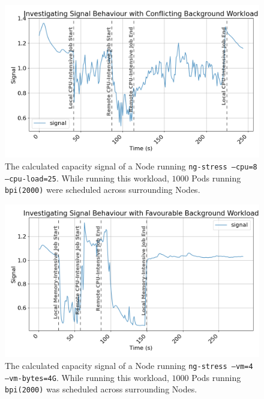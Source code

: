 \begin{figure}[H]
    \centering
    \includegraphics[width=\textwidth]{images/signal-with-cpu.png}
    \caption{The calculated capacity signal of a Node running \texttt{ng-stress
    --cpu=8 --cpu-load=25}. While running this workload, $1000$ Pods running
    \texttt{bpi(2000)} were scheduled across surrounding Nodes.}
    \label{fig:signal-evaluation-cpu}
\end{figure}
\begin{figure}[H]
    \centering
    \includegraphics[width=\textwidth]{images/signal-with-memory.png}
    \caption{The calculated capacity signal of a Node running \texttt{ng-stress
    --vm=4 --vm-bytes=4G}. While running this workload, $1000$ Pods running
    \texttt{bpi(2000)} was scheduled across surrounding Nodes.}
    \label{fig:signal-evaluation-mem}
\end{figure}

